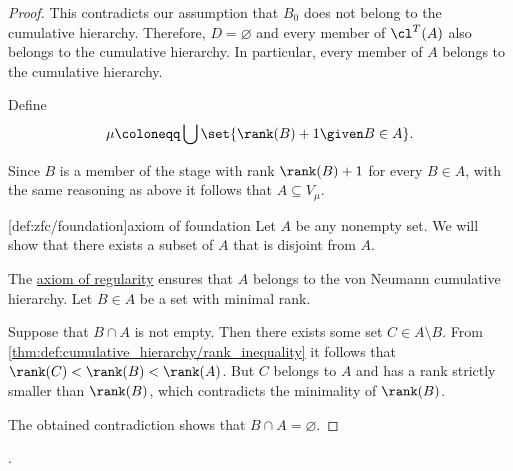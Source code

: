 \begin{proof}
  This contradicts our assumption that \( B_0 \) does not belong to the cumulative hierarchy. Therefore, \( D = \varnothing \) and every member of \( \cl^T(A) \) also belongs to the cumulative hierarchy. In particular, every member of \( A \) belongs to the cumulative hierarchy.

  Define
  \begin{equation*}
    \mu \coloneqq \bigcup\set{ \rank(B) + 1 \given B \in A }.
  \end{equation*}

  Since \( B \) is a member of the stage with rank \( \rank(B) + 1 \) for every \( B \in A \), with the same reasoning as above it follows that \( A \subseteq V_\mu \).

  [def:zfc/foundation]{axiom of foundation} Let \( A \) be any nonempty set. We will show that there exists a subset of \( A \) that is disjoint from \( A \).

  The \hyperref[thm:axiom_of_regularity]{axiom of regularity} ensures that \( A \) belongs to the von Neumann cumulative hierarchy. Let \( B \in A \) be a set with minimal rank.

  Suppose that \( B \cap A \) is not empty. Then there exists some set \( C \in A \setminus B \). From \cref{thm:def:cumulative_hierarchy/rank_inequality} it follows that \( \rank(C) < \rank(B) < \rank(A) \). But \( C \) belongs to \( A \) and has a rank strictly smaller than \( \rank(B) \), which contradicts the minimality of \( \rank(B) \).

  The obtained contradiction shows that \( B \cap A = \varnothing \).
\end{proof}

\begin{remark}\label{rem:cardinals_via_scotts_trick}
  \cite{MathOF:defining_constructive_cardinality}.
\end{remark}

